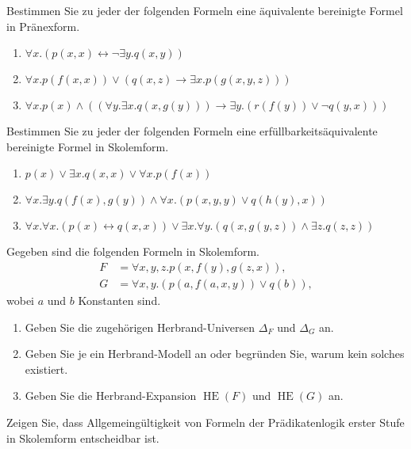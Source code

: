 \documentclass[german]{latteachCD}[2017/03/28]
\begin{document}
\begin{exercise}
  Bestimmen Sie zu jeder der folgenden Formeln eine äquivalente bereinigte
  Formel in Pränexform.
  \begin{enumerate}
  \item $\forall x.(p(x,x) \leftrightarrow \lnot \exists y.q(x,y))$
  \item $\forall x.p(f(x,x)) \lor (q(x,z) \to \exists x.p(g(x,y,z)))$
  \item $\forall x.p(x) \land ((\forall y.\exists x.q(x,g(y))) \to \exists
    y.(r(f(y)) \lor \lnot q(y,x)))$
  \end{enumerate}
\end{exercise}

\newpage

\begin{exercise}
  Bestimmen Sie zu jeder der folgenden Formeln eine erfüllbarkeitsäquivalente
  bereinigte Formel in Skolemform.
  \begin{enumerate}
  \item $p(x) \lor \exists x.q(x,x) \lor \forall x.p(f(x))$
  \item $\forall x.\exists y.q(f(x),g(y)) \land \forall x.(p(x,y,y) \lor
    q(h(y),x))$
  \item $\forall x.\forall x.(p(x) \leftrightarrow q(x,x)) \lor \exists
    x.\forall y.(q(x,g(y,z)) \land \exists z.q(z,z))$
  \end{enumerate}
\end{exercise}


\begin{exercise}
  Gegeben sind die folgenden Formeln in Skolemform.
  \begin{align*}
    F &= \forall x, y, z. p(x,f(y),g(z,x)),\\
    G &= \forall x,y. (p(a,f(a,x,y)) \lor q(b)),
  \end{align*}
  wobei $a$ und $b$ Konstanten sind.
  \begin{enumerate}
  \item Geben Sie die zugehörigen Herbrand-Universen $\Delta_{F}$ und
    $\Delta_{G}$ an.
  \item Geben Sie je ein Herbrand-Modell an oder begründen Sie, warum kein
    solches existiert.
  \item Geben Sie die Herbrand-Expansion $\operatorname{HE}(F)$ und
    $\operatorname{HE}(G)$ an.
  \end{enumerate}
\end{exercise}

\begin{exercise}
  Zeigen Sie, dass Allgemeingültigkeit von Formeln der Prädikatenlogik erster
  Stufe in Skolemform entscheidbar ist.
\end{exercise}
\end{document}
